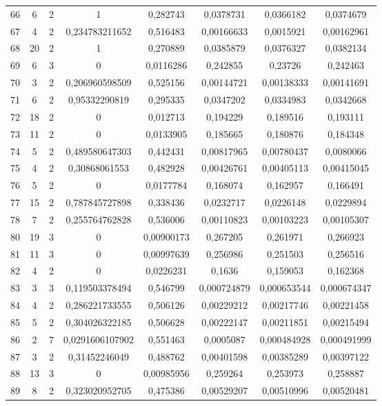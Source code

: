 \begin{longtable}{|c|c|c|c|c|c|c|c|}
66 & 6 & 2 & 1 & 0,282743 & 0,0378731 & 0,0366182 & 0,0374679  \\
67 & 4 & 2 & 0,234783211652 & 0,516483 & 0,00166633 & 0,0015921 & 0,00162961  \\
68 & 20 & 2 & 1 & 0,270889 & 0,0385879 & 0,0376327 & 0,0382134  \\
69 & 6 & 3 & 0 & 0,0116286 & 0,242855 & 0,23726 & 0,242463  \\
70 & 3 & 2 & 0,206960598509 & 0,525156 & 0,00144721 & 0,00138333 & 0,00141691  \\
71 & 6 & 2 & 0,95332290819 & 0,295335 & 0,0347202 & 0,0334983 & 0,0342668  \\
72 & 18 & 2 & 0 & 0,012713 & 0,194229 & 0,189516 & 0,193111  \\
73 & 11 & 2 & 0 & 0,0133905 & 0,185665 & 0,180876 & 0,184348  \\
74 & 5 & 2 & 0,489580647303 & 0,442431 & 0,00817965 & 0,00780437 & 0,0080066  \\
75 & 4 & 2 & 0,30868061553 & 0,482928 & 0,00426761 & 0,00405113 & 0,00415045  \\
76 & 5 & 2 & 0 & 0,0177784 & 0,168074 & 0,162957 & 0,166491  \\
77 & 15 & 2 & 0,787845727898 & 0,338436 & 0,0232717 & 0,0226148 & 0,0229894  \\
78 & 7 & 2 & 0,255764762828 & 0,536006 & 0,00110823 & 0,00103223 & 0,00105307  \\
80 & 19 & 3 & 0 & 0,00900173 & 0,267205 & 0,261971 & 0,266923  \\
81 & 11 & 3 & 0 & 0,00997639 & 0,256986 & 0,251503 & 0,256516  \\
82 & 4 & 2 & 0 & 0,0226231 & 0,1636 & 0,159053 & 0,162368  \\
83 & 3 & 3 & 0,119503378494 & 0,546799 & 0,000724879 & 0,000653544 & 0,000674347  \\
84 & 4 & 2 & 0,286221733555 & 0,506126 & 0,00229212 & 0,00217746 & 0,00221458  \\
85 & 5 & 2 & 0,304026322185 & 0,506628 & 0,00222147 & 0,00211851 & 0,00215494  \\
86 & 2 & 7 & 0,0291606107902 & 0,551463 & 0,0005087 & 0,000484928 & 0,000491999  \\
87 & 3 & 2 & 0,31452246049 & 0,488762 & 0,00401598 & 0,00385289 & 0,00397122  \\
88 & 13 & 3 & 0 & 0,00985956 & 0,259264 & 0,253973 & 0,258887  \\
89 & 8 & 2 & 0,323020952705 & 0,475386 & 0,00529207 & 0,00510996 & 0,00520481  \\

\end{longtable}
